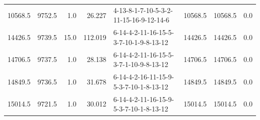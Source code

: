\begin{tabular}{rrrrlrrr}
 10568.5 &   9752.5 &            1.0 &             26.227 &  4-13-8-1-7-10-5-3-2-11-15-16-9-12-14-6 &       10568.5 &         10568.5 &       0.0 \\
 14426.5 &   9739.5 &           15.0 &            112.019 &  6-14-4-2-11-16-15-5-3-7-10-1-9-8-13-12 &       14426.5 &         14426.5 &       0.0 \\
 14706.5 &   9737.5 &            1.0 &             28.138 &  6-14-4-2-11-16-15-5-3-7-1-10-9-8-13-12 &       14706.5 &         14706.5 &       0.0 \\
 14849.5 &   9736.5 &            1.0 &             31.678 &  6-14-4-2-16-11-15-9-5-3-7-10-1-8-13-12 &       14849.5 &         14849.5 &       0.0 \\
 15014.5 &   9721.5 &            1.0 &             30.012 &  6-14-4-2-11-16-15-9-5-3-7-10-1-8-13-12 &       15014.5 &         15014.5 &       0.0 \\
\bottomrule
\end{tabular}
